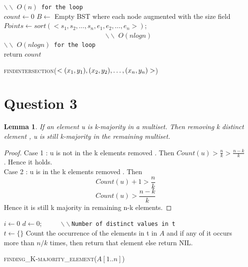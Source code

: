 \documentclass[11pt]{article}
\newtheorem{lemma}[theorem]{Lemma}
\begin{document}
\begin{algorithm}
 $\backslash \backslash$ {\tt{$O(n)$ for the loop}} \\
$count \leftarrow  0$ \;
$B \leftarrow$ Empty BST where each node augmented with the size field \;
$Points \leftarrow sort (<s_1,s_2,\ldots,s_{n},e_1,e_2,\ldots,e_{n}>)$;  ~~~~~~~~~~~~~~~~~~~~~~~~~~~~~~$\backslash \backslash$ {\tt{$O(nlog n)$}} \\
$\backslash \backslash$ {\tt{$O(nlog n)$ for the loop}}   \\                                                                   
    return $count $
\caption{\textsc{findintersection(\(<(x\sb1,y\sb1),(x\sb2,y\sb2),\ldots ,(x\sb{n},y\sb{n})>\)) }}
\label{chord_intersection}
\end{algorithm}
\pagebreak
	
\section*{Question 3}
\begin{lemma} If an element u is k-majority in a multiset. Then removing k distinct element , u is still k-majority in the remaining multiset. 
\end{lemma}
\begin{proof}
Case 1 : u is not in the k elements removed .  Then $Count(u)>\frac{n}{k}>\frac{n-k}{k}$ . Hence it holds. \\
Case 2 : u is in the k elements removed . Then 
\[Count(u)+1>\frac{n}{k}\]
\[Count(u)>\frac{n-k}{k}\]
Hence it is still k majority in remaining n-k elements.
\end{proof}

\begin{algorithm}
$i\leftarrow 0$\;
$d\leftarrow 0$;    ~~~~~$\backslash \backslash${\tt{Number of distinct values in t}} \\
$t\leftarrow \lbrace \rbrace$\;
Count the occurrence of the elements in t in $A$ and if any of it occurs more than $n/k$ times, then return that element else return NIL.
\caption{\textsc{finding\_K-majority\_element}($A[1..n]$)}
\label{majority-element-algo}

\end{algorithm}
\end{document}
